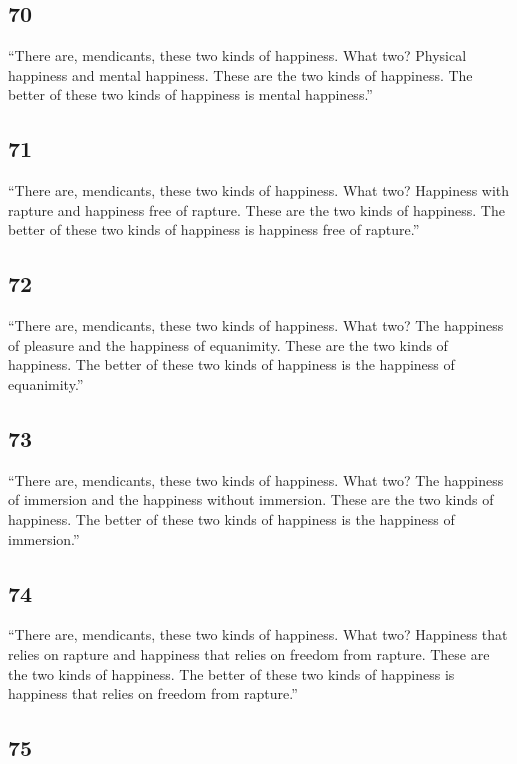 \documentclass[12pt,openany]{book}%
\begin{document}
\subsection*{70 }

“There are, mendicants, these two kinds of happiness. What two? Physical happiness and mental happiness. These are the two kinds of happiness. The better of these two kinds of happiness is mental happiness.” 

\subsection*{71 }

“There are, mendicants, these two kinds of happiness. What two? Happiness with rapture and happiness free of rapture. These are the two kinds of happiness. The better of these two kinds of happiness is happiness free of rapture.” 

\subsection*{72 }

“There are, mendicants, these two kinds of happiness. What two? The happiness of pleasure and the happiness of equanimity. These are the two kinds of happiness. The better of these two kinds of happiness is the happiness of equanimity.” 

\subsection*{73 }

“There are, mendicants, these two kinds of happiness. What two? The happiness of immersion and the happiness without immersion. These are the two kinds of happiness. The better of these two kinds of happiness is the happiness of immersion.” 

\subsection*{74 }

“There are, mendicants, these two kinds of happiness. What two? Happiness that relies on rapture and happiness that relies on freedom from rapture. These are the two kinds of happiness. The better of these two kinds of happiness is happiness that relies on freedom from rapture.” 

\subsection*{75 }
\end{document}
